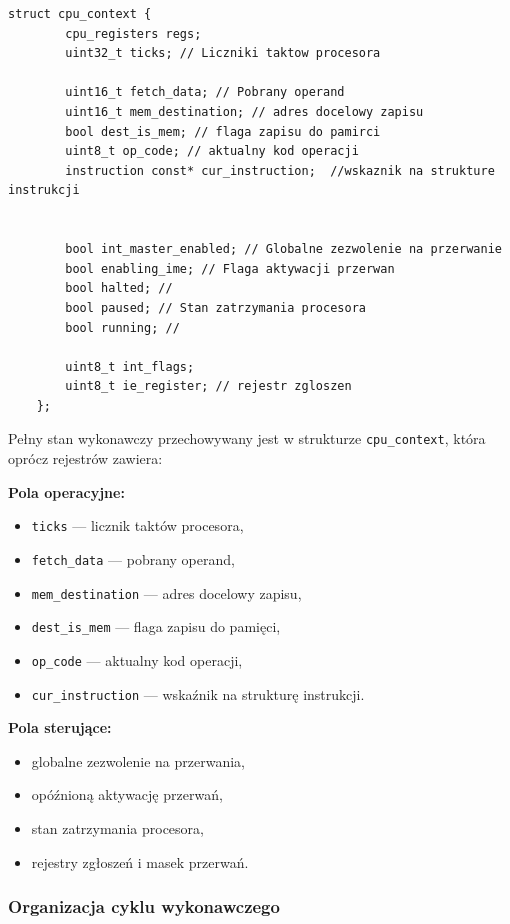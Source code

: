 \documentclass{article}
\begin{document}
\begin{lstlisting}[style=cpp,caption={Kontekst wykonania procesora},label={lst:cpu_context}]
	struct cpu_context {
		cpu_registers regs;
		uint32_t ticks; // Liczniki taktow procesora
		
		uint16_t fetch_data; // Pobrany operand
		uint16_t mem_destination; // adres docelowy zapisu
		bool dest_is_mem; // flaga zapisu do pamirci
		uint8_t op_code; // aktualny kod operacji
		instruction const* cur_instruction;  //wskaznik na strukture instrukcji
		
		
		bool int_master_enabled; // Globalne zezwolenie na przerwanie
		bool enabling_ime; // Flaga aktywacji przerwan
		bool halted; // 
		bool paused; // Stan zatrzymania procesora
		bool running; //
		
		uint8_t int_flags;
		uint8_t ie_register; // rejestr zgloszen
	};
\end{lstlisting}
Pełny stan wykonawczy przechowywany jest w strukturze \texttt{cpu\_context}, która oprócz rejestrów zawiera:



\textbf{Pola operacyjne:}
\begin{itemize}
	\item \texttt{ticks} --- licznik taktów procesora,
	\item \texttt{fetch\_data} --- pobrany operand,
	\item \texttt{mem\_destination} --- adres docelowy zapisu,
	\item \texttt{dest\_is\_mem} --- flaga zapisu do pamięci,
	\item \texttt{op\_code} --- aktualny kod operacji,
	\item \texttt{cur\_instruction} --- wskaźnik na strukturę instrukcji.
\end{itemize}

\textbf{Pola sterujące:}
\begin{itemize}
	\item globalne zezwolenie na przerwania,
	\item opóźnioną aktywację przerwań,
	\item stan zatrzymania procesora,
	\item rejestry zgłoszeń i masek przerwań.
\end{itemize}

\subsubsection{Organizacja cyklu wykonawczego}
\end{document}
